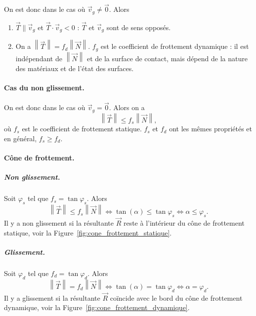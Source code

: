             On est donc dans le cas où $\vec{v}_g\neq\vec{0}$. Alors
            \begin{enumerate}
                \item $\vec{T}\parallel\vec{v}_g$ et $\vec{T}\cdot\vec{v}_g<0$ : $\vec{T}$ et $\vec{v}_g$ sont de sens opposés.
                \item On a $\left\lVert\vec{T}\right\rVert=f_d\left\lVert\vec{N}\right\rVert$. $f_g$ est le coefficient de frottement dynamique : il est indépendant de $\left\lVert\vec{N}\right\rVert$ et de la surface de contact, mais dépend de la nature des matériaux et de l'état des surfaces.
            \end{enumerate}

        \paragraph{Cas du non glissement.} 
        
            On est donc dans le cas où $\vec{v}_g=\vec{0}$. Alors on a
            \begin{equation*}
                \left\lVert\vec{T}\right\rVert\leqslant f_s\left\lVert\vec{N}\right\rVert,
            \end{equation*}
            où $f_s$ est le coefficient de frottement statique. $f_s$ et $f_d$ ont les mêmes propriétés et en général, $f_s\geqslant f_d$.


        \paragraph{Cône de frottement.}

            \subparagraph{Non glissement.} Soit $\varphi_{s}$ tel que $f_s=\tan\varphi_s$. Alors 
            \begin{equation*}
                \left\lVert\vec{T}\right\rVert\leqslant f_s\left\lVert\vec{N}\right\rVert\Leftrightarrow\tan(\alpha)\leqslant\tan\varphi_s\Leftrightarrow\alpha\leqslant\varphi_s.
            \end{equation*}
            Il y a non glissement si la résultante $\vec{R}$ reste à l'intérieur du cône de frottement statique, voir la Figure~\ref{fig:cone_frottement_statique}.

            \subparagraph{Glissement.} Soit $\varphi_{d}$ tel que $f_d=\tan\varphi_d$. Alors 
            \begin{equation*}
                \left\lVert\vec{T}\right\rVert= f_d\left\lVert\vec{N}\right\rVert\Leftrightarrow\tan(\alpha)=\tan\varphi_d\Leftrightarrow\alpha=\varphi_d.
            \end{equation*}
            Il y a glissement si la résultante $\vec{R}$ coïncide avec le bord du cône de frottement dynamique, voir la Figure~\ref{fig:cone_frottement_dynamique}.

